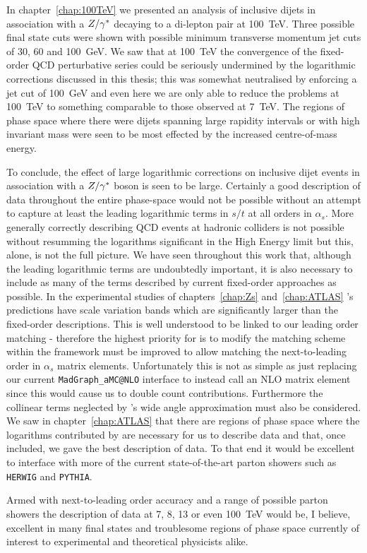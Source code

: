 In chapter~\ref{chap:100TeV} we presented an analysis of inclusive dijets in association with a $Z/\gamma^*$
decaying to a di-lepton pair at 100~TeV.  Three possible final state cuts were shown with possible
minimum transverse momentum jet cuts of 30, 60 and 100~GeV.  We saw that at 100~TeV the
convergence of the fixed-order QCD perturbative series could be seriously undermined by the logarithmic
corrections discussed in this thesis; this was somewhat neutralised by enforcing a jet cut of
100~GeV and even here we are only able to reduce the problems at 100~TeV to something comparable
to those observed at 7~TeV.  The regions of phase space where there were dijets spanning
large rapidity intervals or with high invariant mass were seen to be most effected by the increased
centre-of-mass energy.

To conclude, the effect of large logarithmic corrections on inclusive dijet events in association
with a $Z/\gamma^*$ boson is seen to be large.  Certainly a good description of data throughout the entire
phase-space would not be possible without an attempt to capture at least the leading logarithmic terms in $s/t$ at all orders in $\alpha_s$.
More generally correctly describing QCD events at hadronic colliders is not possible without resumming
the logarithms significant in the High Energy limit but this, alone, is not the full picture.  We have
seen throughout this work that, although the leading logarithmic terms are undoubtedly important, it is
also necessary to include as many of the terms described by current fixed-order approaches as possible.
In the experimental studies of chapters~\ref{chap:Zs} and~\ref{chap:ATLAS} \HEJ's predictions have
scale variation bands which are significantly larger than the fixed-order descriptions.  This is well
understood to be linked to our leading order matching - therefore the highest priority for \hej is to
modify the matching scheme within the \hej framework must be improved to allow matching the next-to-leading
order in $\alpha_s$ matrix elements.  Unfortunately this is not as simple as just replacing our current
\texttt{MadGraph\_aMC@NLO} interface to instead call an NLO matrix element since this would cause us to double
count contributions.  Furthermore the collinear terms neglected by \hej's wide angle approximation must
also be considered.  We saw in chapter~\ref{chap:ATLAS} that there are regions of phase space where the
logarithms contributed by \ARIADNE are necessary for us to describe data and that, once included, we gave
the best description of data.  To that end it would be excellent to interface \HEJ with more of the current
state-of-the-art parton showers such as \texttt{HERWIG} and \texttt{PYTHIA}.

Armed with next-to-leading
order accuracy and a range of possible parton showers the description of data at 7, 8, 13 or even 100~TeV
would be, I believe, excellent in many final states and troublesome regions of phase space currently of
interest to experimental and theoretical physicists alike.

